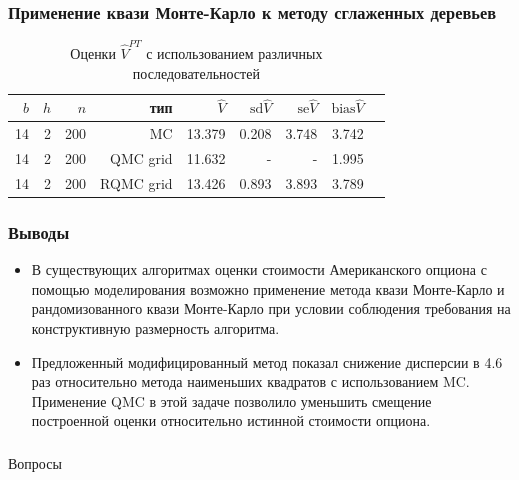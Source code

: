 \documentclass[unicode, notheorems]{beamer}
\newcommand{\Vhat}{\hat{V}}
\begin{document}
\begin{frame}[t]\frametitle{Применение квази Монте-Карло к методу сглаженных деревьев}
    
    \begin{table}
      \caption{Оценки $\Vhat^{PT}$ с использованием различных последовательностей}
      \label{tab:qmc_pruned_tree}
      \centering
    
      \begin{tabular}{rrrrrrrrr}
      $b$&$h$&$n$&тип&$\Vhat$&$\mathrm{sd}\Vhat$&$\mathrm{se}\Vhat$&$\mathrm{bias}\Vhat$\\\hline
      14&2&200&MC&13.379&0.208&3.748&3.742\\
      14&2&200&QMC grid&\textcolor{beamer@blendedblue}{11.632}&-&-&1.995\\
      14&2&200&RQMC grid&13.426&0.893&3.893&3.789\\
      \end{tabular}
    \end{table}

\end{frame}

\begin{frame}[t]\frametitle{Выводы}
    
\begin{itemize}
  \item В существующих алгоритмах оценки стоимости Американского опциона с помощью моделирования возможно применение метода квази Монте-Карло и рандомизованного квази Монте-Карло при условии соблюдения требования на конструктивную размерность алгоритма.
  \item Предложенный модифицированный метод показал снижение дисперсии в 4.6 раз относительно метода наименьших квадратов с использованием MC. Применение QMC в этой задаче позволило уменьшить смещение построенной оценки относительно истинной стоимости опциона.
\end{itemize}

\end{frame}

\begin{frame}[c]
\frametitle{  }
    
\centering
Вопросы

\end{frame}
\end{document}
